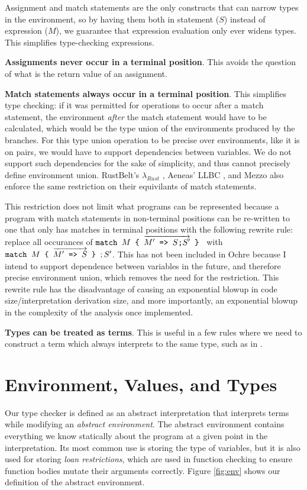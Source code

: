 \documentclass[12pt,twoside]{report}
\begin{document}
Assignment and match statements are the only constructs that can narrow types in the environment, so by having them both in statement ($S$) instead of expression ($M$), we guarantee that expression evaluation only ever widens types. This simplifies type-checking expressions.

\textbf{Assignments never occur in a terminal position}. This avoids the question of what is the return value of an assignment.

\textbf{Match statements always occur in a terminal position}. This simplifies type checking: if it was permitted for operations to occur after a match statement, the environment \textit{after} the match statement would have to be calculated, which would be the type union of the environments produced by the branches. For this type union operation to be precise over environments, like it is on pairs, we would have to support dependencies between variables. We do not support such dependencies for the sake of simplicity, and thus cannot precisely define environment union. RustBelt's $\lambda_{Rust}$ \citep{jungRustBeltSecuringFoundations2018a}, Aeneas' LLBC \cite[Section 4.3]{aeneas}, and Mezzo \cite{protzenkoMezzoTypedLanguage2014} also enforce the same restriction on their equivilants of match statements.

This restriction does not limit what programs can be represented because a program with match statements in non-terminal positions can be re-written to one that only has matches in terminal positions with the following rewrite rule: replace all occurances of $\text{\texttt{match $M$ \{ $\overrightarrow{M' \text{\texttt{ => }} S \text{\texttt{;}} S'}$ \} }}$ with $\text{\texttt{match $M$ \{ $\overrightarrow{M' \text{\texttt{ => }} S}$ \} }}; S'$. This has not been included in Ochre because I intend to support dependence between variables in the future, and therefore precise environment union, which removes the need for the restriction. This rewrite rule has the disadvantage of causing an exponential blowup in code size/interpretation derivation size, and more importantly, an exponential blowup in the complexity of the analysis once implemented.

\textbf{Types can be treated as terms}. This is useful in a few rules where we need to construct a term which always interprets to the same type, such as in .

\section{Environment, Values, and Types}
\label{section:environmentvaluestypes}
Our type checker is defined as an abstract interpretation that interprets terms while modifying an \textit{abstract environment}. The abstract environment contains everything we know statically about the program at a given point in the interpretation. Its most common use is storing the type of variables, but it is also used for storing \textit{loan restrictions}, which are used in function checking to ensure function bodies mutate their arguments correctly. Figure \ref{fig:env} shows our definition of the abstract environment.
\end{document}
